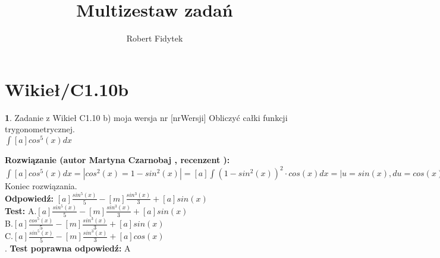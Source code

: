\documentclass[12pt, a4paper]{article}
\title{Multizestaw zadań}
\author{Robert Fidytek}
\date{}
\theoremstyle{definition} %
\newtheorem{zad}{}
\newcommand{\kategoria}[1]{\section{#1}} %
\newcommand{\zadStart}[1]{\begin{zad}#1\newline} %
\newcommand{\zadStop}{\end{zad}}   %
\newcommand{\rozwStart}[2]{\noindent \textbf{Rozwiązanie (autor #1 , recenzent #2): }\newline} %
\newcommand{\rozwStop}{\newline}                                            %
\newcommand{\odpStart}{\noindent \textbf{Odpowiedź:}\newline}    %
\newcommand{\odpStop}{\newline}                                             %
\newcommand{\testStart}{\noindent \textbf{Test:}\newline} %
\newcommand{\testStop}{\newline} %
\newcommand{\kluczStart}{\noindent \textbf{Test poprawna odpowiedź:}\newline} %
\newcommand{\kluczStop}{\newline} %
\begin{document}
\maketitle


\kategoria{Wikieł/C1.10b}
\zadStart{Zadanie z Wikieł C1.10 b) moja wersja nr [nrWersji]}
Obliczyć całki funkcji trygonometrycznej.\\
$\int [a] cos^{5}(x) dx$\\
\zadStop
\rozwStart{Martyna Czarnobaj}{}
	$\int [a] cos^{5}(x) dx = | cos^{2}(x)=1-sin^{2}(x)| = [a] \int (1-sin^{2}(x))^{2} \cdot cos(x) dx = |u=sin(x), du=cos(x)dx| = [a] \int (1 - u^{2})^{2} du = [a] \int u^{4} - 2u^{2} + 1 du = [a] (\int u^{4} du - 2 \int u^{2} du + \int 1 du) = [a] \frac{u^{5}}{5} - [m] \frac{u^{3}}{3} + [a]u = [a] \frac{sin^{5}(x)}{5} - [m] \frac{sin^{3}(x)}{3} + [a]sin(x)$\\


Koniec rozwiązania.\\
\rozwStop
\odpStart
$ [a] \frac{sin^{5}(x)}{5} - [m] \frac{sin^{3}(x)}{3} + [a]sin(x) $\\
\odpStop
\testStart
A.$[a] \frac{sin^{5}(x)}{5} - [m] \frac{sin^{3}(x)}{3} + [a]sin(x) $\\
B.$[a] \frac{cos^{5}(x)}{5} - [m] \frac{sin^{3}(x)}{3} + [a]sin(x) $\\
C.$[a] \frac{sin^{5}(x)}{5} - [m] \frac{sin^{3}(x)}{3} + [a]cos(x)$\\
.
\testStop
\kluczStart
A
\kluczStop
\end{document}
